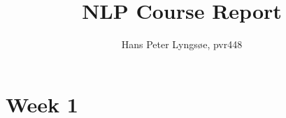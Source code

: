 \documentclass{article}
\begin{document}

\title{NLP Course Report}
\author{Hans Peter Lyngsøe, pvr448}

\maketitle

\section{Week 1}
\end{document}
